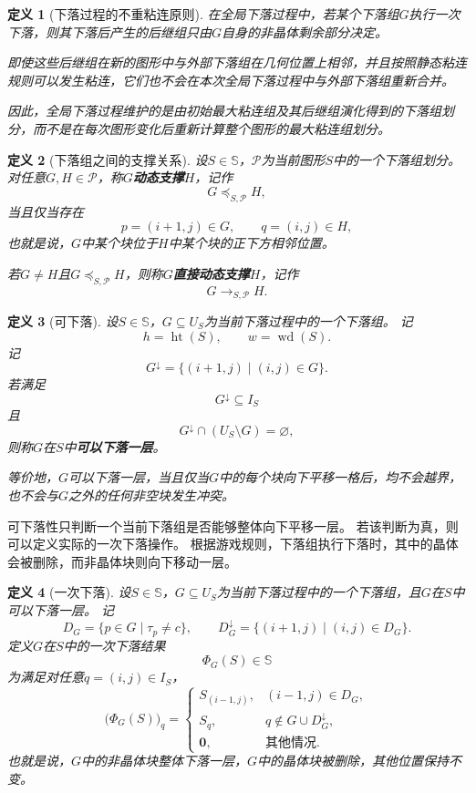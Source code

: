 \documentclass[UTF8,fontset=none]{ctexart}
\theoremstyle{cnthm}
\newtheorem{definition}{定义}[section]
\begin{document}
			\begin{definition}[下落过程的不重粘连原则]
				在全局下落过程中，若某个下落组$G$执行一次下落，则其下落后产生的后继组只由$G$自身的非晶体剩余部分决定。
				
				即使这些后继组在新的图形中与外部下落组在几何位置上相邻，并且按照静态粘连规则可以发生粘连，它们也不会在本次全局下落过程中与外部下落组重新合并。
				
				因此，全局下落过程维护的是由初始最大粘连组及其后继组演化得到的下落组划分，而不是在每次图形变化后重新计算整个图形的最大粘连组划分。
			\end{definition}
			
			\begin{definition}[下落组之间的支撑关系]
				设$S\in\mathbb{S}$，$\mathcal{P}$为当前图形$S$中的一个下落组划分。
				对任意$G,H\in\mathcal{P}$，称$G$\textbf{动态支撑}$H$，记作
				$$
				G\preceq_{S,\mathcal{P}}H,
				$$
				当且仅当存在
				$$
				p=(i+1,j)\in G,\qquad q=(i,j)\in H,
				$$
				也就是说，$G$中某个块位于$H$中某个块的正下方相邻位置。
				
				若$G\neq H$且$G\preceq_{S,\mathcal{P}}H$，则称$G$\textbf{直接动态支撑}$H$，记作
				$$
				G\to_{S,\mathcal{P}}H.
				$$
			\end{definition}
			
			\begin{definition}[可下落]
				设$S\in\mathbb{S}$，$G\subseteq U_S$为当前下落过程中的一个下落组。
				记
				$$
				h=\operatorname{ht}(S),\qquad w=\operatorname{wd}(S).
				$$
				记
				$$
				G^\downarrow=\{(i+1,j)\mid (i,j)\in G\}.
				$$
				若满足
				$$
				G^\downarrow\subseteq I_S
				$$
				且
				$$
				G^\downarrow\cap (U_S\setminus G)=\varnothing,
				$$
				则称$G$在$S$中\textbf{可以下落一层}。
				
				等价地，$G$可以下落一层，当且仅当$G$中的每个块向下平移一格后，均不会越界，也不会与$G$之外的任何非空块发生冲突。
			\end{definition}
			
			可下落性只判断一个当前下落组是否能够整体向下平移一层。
			若该判断为真，则可以定义实际的一次下落操作。
			根据游戏规则，下落组执行下落时，其中的晶体会被删除，而非晶体块则向下移动一层。
			
			\begin{definition}[一次下落]
				设$S\in\mathbb{S}$，$G\subseteq U_S$为当前下落过程中的一个下落组，且$G$在$S$中可以下落一层。
				记
				$$
				D_G=\{p\in G\mid \tau_p\neq c\},
				\qquad
				D_G^\downarrow=\{(i+1,j)\mid (i,j)\in D_G\}.
				$$
				定义$G$在$S$中的一次下落结果
				$$
				\Phi_G(S)\in\mathbb{S}
				$$
				为满足对任意$q=(i,j)\in I_S$，
				$$
				\bigl(\Phi_G(S)\bigr)_q
				=
				\begin{cases}
					S_{(i-1,j)}, & (i-1,j)\in D_G,\\
					S_q, & q\notin G\cup D_G^\downarrow,\\
					\mathbf{0}, & \text{其他情况}.
				\end{cases}
				$$
				也就是说，$G$中的非晶体块整体下落一层，$G$中的晶体块被删除，其他位置保持不变。
			\end{definition}
			
\end{document}
